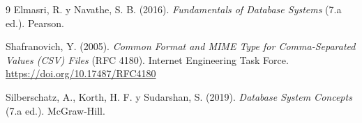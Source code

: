 



\clearpage
{}
\tableofcontents
\clearpage
{}










\clearpage
{}
\begin{thebibliography}{9}
Elmasri, R. y Navathe, S. B. (2016).
\textit{Fundamentals of Database Systems} (7.a ed.). Pearson.

Shafranovich, Y. (2005).
\textit{Common Format and MIME Type for Comma-Separated Values (CSV) Files}
(RFC 4180). Internet Engineering Task Force.
\url{https://doi.org/10.17487/RFC4180}

Silberschatz, A., Korth, H. F. y Sudarshan, S. (2019).
\textit{Database System Concepts} (7.a ed.). McGraw-Hill.
\end{thebibliography}


